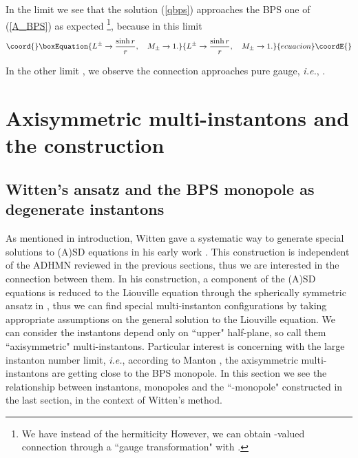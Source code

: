 \documentclass[a4paper,10pt]{article}
\providecommand{\sutwo}{\myHighlight{$SU(2)$}\coordHE{} }
\providecommand{\ie}{\textit{i.e.}}
\begin{document}
In the limit \coordHE{} we see that the solution (\ref{qbps}) approaches the BPS one \coordHE{} of (\ref{A_BPS}) as expected
\footnote[2]{We have \coordHE{} instead of the hermiticity \coordHE{}
 However, we can obtain \coordHE{}-valued connection through a ``gauge transformation" with \coordHE{} \cite{KN}.}, because in this limit
\begin{equation}\coord{}\boxEquation{
L^{\pm} \rightarrow \frac{\sinh{r}}{r}, \quad M_{\pm} \rightarrow 1.
}{
L^{\pm} \rightarrow \frac{\sinh{r}}{r}, \quad M_{\pm} \rightarrow 1.
}{ecuacion}\coordE{}\end{equation}


In the other limit \coordHE{}, we observe the connection approaches pure gauge, \ie, \coordHE{}.


\section{Axisymmetric multi-instantons and the \coordHE{} construction}
\subsection{Witten's ansatz and the BPS monopole as degenerate instantons}

As mentioned in introduction, Witten gave a systematic way to generate special  solutions to \sutwo (A)SD equations in his early work \cite{W}.
This construction is independent of the ADHMN reviewed in the previous sections, thus we are interested in the connection between them.
In his construction, a component of the (A)SD equations is reduced to the Liouville equation through the spherically symmetric ansatz in \coordHE{}, thus we can find special multi-instanton configurations by taking appropriate assumptions on the general solution to the Liouville equation.
We can consider the instantons depend only on \coordHE{} ``upper" half-plane, so call them ``axisymmetric" multi-instantons.
Particular interest is concerning with the large instanton number limit, \ie, according to Manton \cite{Mant}, the axisymmetric multi-instantons are getting close to the BPS monopole.
In this section we see the relationship between instantons, monopoles and the ``\coordHE{}-monopole" constructed in the last section, in the context of Witten's method.
\end{document}
